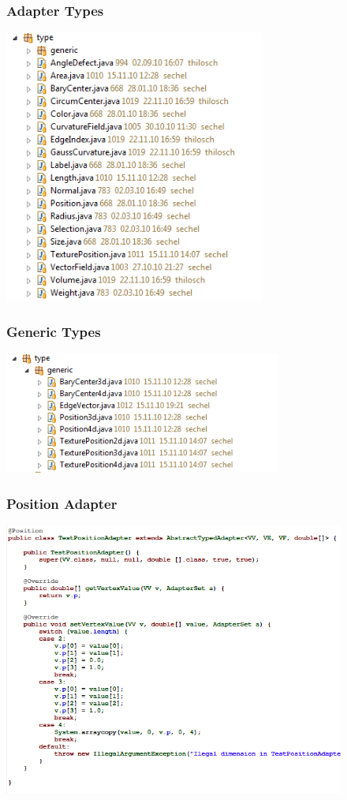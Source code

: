 \documentclass[12pt]{beamer}
\begin{document}
\begin{frame}
\frametitle{Adapter Types}
\begin{center}
\includegraphics[height=9cm]{adaptertypes.png}\\	
\end{center}
\end{frame}

\begin{frame}
\frametitle{Generic Types}
\begin{center}
\includegraphics[height=4cm]{genericadapters.png}\\	
\end{center}
\end{frame}

\begin{frame}
\frametitle{Position Adapter}
\begin{center}
\includegraphics[height=9cm]{testadapter.png}\\	
\end{center}
\end{frame}
\end{document}
